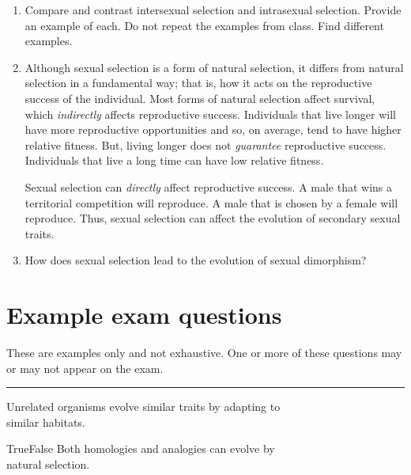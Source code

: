 \documentclass[letterpaper]{tufte-handout}
\begin{document}
\begin{enumerate}
	\item Compare and contrast intersexual selection and intrasexual selection. Provide an example of each. Do not repeat the examples from class. Find different examples.   

	\item Although sexual selection is a form of natural selection, it differs from natural selection in a fundamental way; that is, how it acts on the reproductive success of the individual. Most forms of natural selection affect survival, which \emph{indirectly} affects reproductive success. Individuals that live longer will have more reproductive opportunities and so, on average, tend to have higher relative fitness. But, living longer does not \emph{guarantee} reproductive success. Individuals that live a long time can have low relative fitness.   
	
	Sexual selection can \emph{directly} affect reproductive success. A male that wins a territorial competition will reproduce. A male that is chosen by a female will reproduce. Thus, sexual selection can affect the evolution of secondary sexual traits.
	
	\item How does sexual selection lead to the evolution of sexual dimorphism?



\end{enumerate}

\section*{Example exam questions}

These are examples only and not exhaustive. One or more of these questions may or may not appear on the exam.

\bigskip

\noindent \rule{1in}{0.4pt} Unrelated organisms evolve similar traits by adapting to\\
\noindent\hspace*{1in} similar habitats. 

\bigskip

\noindent True\hspace{1em}False\hspace{1em} Both homologies and analogies can evolve by \\
\noindent {}  natural selection.
\end{document}
